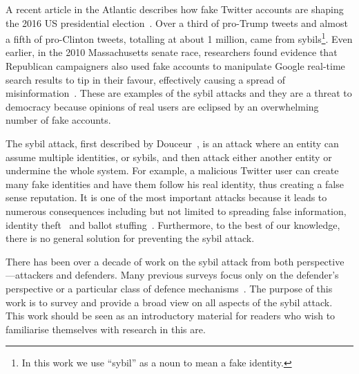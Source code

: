
\begin{comment}
Electronic commerce and online social networks allow us to orchestrate many
aspects of our lives in the comfort of our homes, behind the monitors of our
devices. With such services, online identity is often required. For example in
Twitter\footnote{Twitter (\texttt{https://twitter.com/}) is a social network website
  where users can send and read short messages---called ``tweets'', users can
  also ``follow'' each other.}, users must create accounts to tweet a friend,
who must also have an account. In this scenario, users can choose to remain
pseudonymous if they are careful, where their real-life identity is uncorrelated
with their online identity. While that is useful for protecting the users'
privacy, it also opens an alleyway for attackers.
\end{comment}

A recent article in the Atlantic describes how fake Twitter accounts are shaping
the 2016 US presidential election~\cite{atlantictwitterbots}. Over a third of
pro-Trump tweets and almost a fifth of pro-Clinton tweets, totalling at about 1
million, came from sybils\footnote{In this work we use ``sybil'' as a noun to
  mean a fake identity.}. Even earlier, in the 2010 Massachusetts senate race,
researchers found evidence that Republican campaigners also used fake accounts
to manipulate Google real-time search results to tip in their favour,
effectively causing a spread of misinformation~\cite{mustafaraj2010obscurity}.
These are examples of the sybil attacks and they are a threat to democracy
because opinions of real users are eclipsed by an overwhelming number of fake
accounts.

The sybil attack, first described by Douceur~\cite{douceur2002sybil}, is an
attack where an entity can assume multiple identities, or sybils, and then
attack either another entity or undermine the whole system. For example, a
malicious Twitter user can create many fake identities and have them follow his
real identity, thus creating a false sense reputation. It is one of the most
important attacks because it leads to numerous consequences including but not
limited to spreading false information, identity theft~\cite{bilge2009all} and
ballot stuffing~\cite{bhattacharjee2005avoiding}. Furthermore, to the best of
our knowledge, there is no general solution for preventing the sybil attack.

There has been over a decade of work on the sybil attack from both
perspective---attackers and defenders. Many previous surveys focus only on the
defender's perspective or a particular class of defence
mechanisms~\cite{marti2006taxonomy, mohaisen2013sybil, rakesh2014survey,
  koll2014state}. The purpose of this work is to survey and provide a broad view
on all aspects of the sybil attack. This work should be seen as an introductory
material for readers who wish to familiarise themselves with research in this
are.

